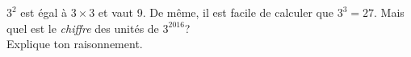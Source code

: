 
$3^2$ est égal à $3\times3$ et vaut 9. De même, il est facile de calculer que $3^3=27$. Mais quel est le \emph{chiffre} des unités de $3^{2016}$?\\
Explique ton raisonnement.
